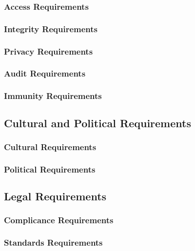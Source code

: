 \documentclass{article}
\begin{document}
\subsubsection{Access Requirements}
\subsubsection{Integrity Requirements}
\subsubsection{Privacy Requirements}
\subsubsection{Audit Requirements}
\subsubsection{Immunity Requirements}

\subsection{Cultural and Political Requirements}
\subsubsection{Cultural Requirements}
\subsubsection{Political Requirements}

\subsection{Legal Requirements}
\subsubsection{Complicance Requirements}
\subsubsection{Standards Requirements}
\end{document}
